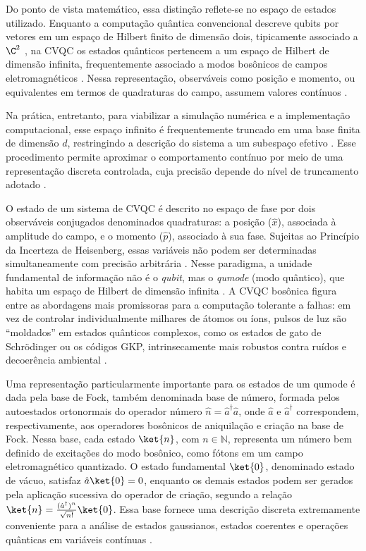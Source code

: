 Do ponto de vista matemático, essa distinção reflete-se no espaço de estados utilizado. Enquanto a computação quântica convencional descreve qubits por vetores em um espaço de Hilbert finito de dimensão dois, tipicamente associado a $\C^2$ \cite{nielsen_quantum_2002}, na CVQC os estados quânticos pertencem a um espaço de Hilbert de dimensão infinita, frequentemente associado a modos bosônicos de campos eletromagnéticos \cite{braunstein2005quantum}. Nessa representação, observáveis como posição e momento, ou equivalentes em termos de quadraturas do campo, assumem valores contínuos \cite{lloyd1999quantum,o2007optical}.

Na prática, entretanto, para viabilizar a simulação numérica e a implementação computacional, esse espaço infinito é frequentemente truncado em uma base finita de dimensão $d$, restringindo a descrição do sistema a um subespaço efetivo \cite{johansson2012qutip}. Esse procedimento permite aproximar o comportamento contínuo por meio de uma representação discreta controlada, cuja precisão depende do nível de truncamento adotado \cite{ripoll2022quantum}.

O estado de um sistema de CVQC é descrito no espaço de fase por dois observáveis conjugados denominados quadraturas: a posição ($\hat{x}$), associada à amplitude do campo, e o momento ($\hat{p}$), associado à sua fase. Sujeitas ao Princípio da Incerteza de Heisenberg, essas variáveis não podem ser determinadas simultaneamente com precisão arbitrária \cite{serafini_quantum_2023, weedbrook2012gaussian}. Nesse paradigma, a unidade fundamental de informação não é o \textit{qubit}, mas o \textit{qumode} (modo quântico), que habita um espaço de Hilbert de dimensão infinita \cite{lloyd1999quantum}. A CVQC bosônica figura entre as abordagens mais promissoras para a computação tolerante a falhas: em vez de controlar individualmente milhares de átomos ou íons, pulsos de luz são ``moldados'' em estados quânticos complexos, como os estados de gato de Schrödinger ou os códigos GKP, intrinsecamente mais robustos contra ruídos e decoerência ambiental \cite{gottesman2000encoding, bourassa2021blueprint}.

Uma representação particularmente importante para os estados de um qumode é dada pela base de Fock, também denominada base de número, formada pelos autoestados ortonormais do operador número $\hat{n}=\hat{a}^{\dagger}\hat{a}$, onde $\hat{a}$ e $\hat{a}^{\dagger}$ correspondem, respectivamente, aos operadores bosônicos de aniquilação e criação na base de Fock. Nessa base, cada estado $\ket{n}$, com $n\in\mathbb{N}$, representa um número bem definido de excitações do modo bosônico, como fótons em um campo eletromagnético quantizado. O estado fundamental $\ket{0}$, denominado estado de vácuo, satisfaz $\hat{a}\ket{0}=0$, enquanto os demais estados podem ser gerados pela aplicação sucessiva do operador de criação, segundo a relação $\ket{n}=\frac{(\hat{a}^{\dagger})^n}{\sqrt{n!}}\ket{0}$. Essa base fornece uma descrição discreta extremamente conveniente para a análise de estados gaussianos, estados coerentes e operações quânticas em variáveis contínuas \cite{serafini_quantum_2023}.


